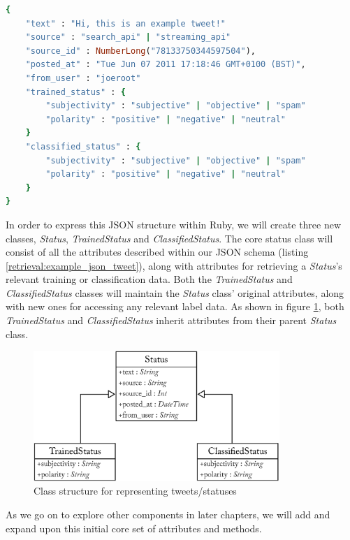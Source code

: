 \begin{lstlisting}[language=Ruby, caption={Basic JSON structure for status objects stored in MongoDB}, label=retrieval:example_json_tweet]
{
	"text" : "Hi, this is an example tweet!"
	"source" : "search_api" | "streaming_api"
	"source_id" : NumberLong("78133750344597504"),
	"posted_at" : "Tue Jun 07 2011 17:18:46 GMT+0100 (BST)",
	"from_user" : "joeroot"
	"trained_status" : {
		"subjectivity" : "subjective" | "objective" | "spam"
		"polarity" : "positive" | "negative" | "neutral"
	}
	"classified_status" : {
		"subjectivity" : "subjective" | "objective" | "spam"
		"polarity" : "positive" | "negative" | "neutral"
	}
}
\end{lstlisting}

In order to express this JSON structure within Ruby, we will create three new classes, \emph{Status}, \emph{TrainedStatus} and \emph{ClassifiedStatus}. The core status class will consist of all the attributes described within our JSON schema (listing \ref{retrieval:example_json_tweet}), along with attributes for retrieving a \emph{Status}'s relevant training or classification data. Both the \emph{TrainedStatus} and \emph{ClassifiedStatus} classes will maintain the \emph{Status} class' original attributes, along with new ones for accessing any relevant label data. As shown in figure \ref{fig:status_uml}, both \emph{TrainedStatus} and \emph{ClassifiedStatus} inherit attributes from their parent \emph{Status} class.

\begin{figure}[h!]
	\caption{Class structure for representing tweets/statuses}
	\label{fig:status_uml}
	\centering
	\includegraphics[width=0.83\textwidth]{figures/status_uml_class_diagram.eps}
\end{figure}

As we go on to explore other components in later chapters, we will add and expand upon this initial core set of attributes and methods. 


